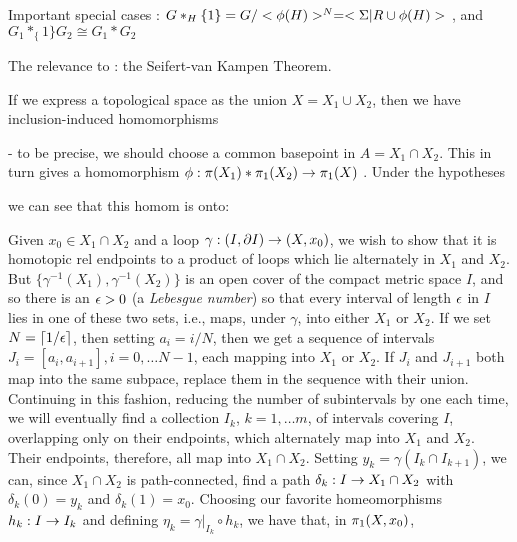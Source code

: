 \msk

Important special cases : $G*_H\{1\} = G/<\phi(H)>^N = <\Sigma | R\cup \phi(H)>$ , and
$G_1*_\{1\}G_2 \cong G_1*G_2$

\bsk

The relevance to \mpu : the Seifert-van Kampen Theorem.

\msk

If we express a topological space as the union $X=X_1\cup X_2$, then we have 
inclusion-induced homomorphisms 


 - to be precise, we should choose a common basepoint in $A=X_1\cap X_2$. This 
in turn gives a homomorphism $\phi:\pi(X_1)*\pi_1(X_2)\rightarrow \pi_1(X)$ . Under the
hypotheses


we can see that this homom is onto:

\msk

Given $x_0\in X_1\cap X_2$ and a loop $\gamma:(I,\partial I)\rightarrow (X,x_0)$, 
we wish to show that it is homotopic rel endpoints to a product of
loops which lie alternately in $X_1$ and $X_2$. But 
$\{\gamma^{-1}(X_1),\gamma^{-1}(X_2)\}$ is an open cover of the compact
metric space $I$, and so there is an $\epsilon > 0$  (a {\it Lebesgue number})
so that every interval of
length $\epsilon$ in $I$ lies in one of these two sets, i.e., maps, under $\gamma$,
into either $X_1$ or $X_2$. If we set $N=\lceil 1/\epsilon\rceil$, then 
setting $a_i=i/N$, then we get a sequence of intervals $J_i=[a_i,a_{i+1}], i=0,\ldots N-1$, 
each mapping
into $X_1$ or $X_2$. If $J_i$ and $J_{i+1}$ both map into the same subpace,
replace them in the sequence with their union. Continuing in this fashion, reducing the number of 
subintervals by one each time, we will eventually
find a collection $I_k$, $k=1,\ldots m$, of intervals covering $I$, 
overlapping only on their
endpoints, which alternately map into $X_1$ and $X_2$. Their endpoints, 
therefore, all map into $X_1\cap X_2$. Setting $y_k=\gamma(I_k\cap I_{k+1})$,
we can, since $X_1\cap X_2$ is path-connected, find a path $\delta_k:I\rightarrow X_1\cap X_2$ 
with $\delta_k(0)=y_k$ and $\delta_k(1)=x_0$. Choosing our favorite homeomorphisms
$h_k:I\rightarrow I_k$ and defining $\eta_k=\gamma|_{I_k}\circ h_k$, we have that, in $\pi_1(X,x_0)$,


